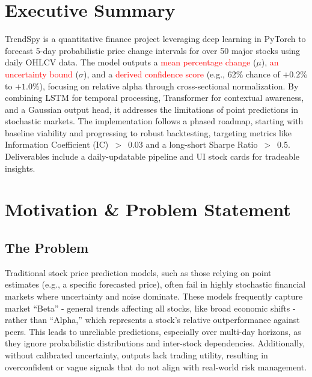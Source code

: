 \documentclass[twoside,final]{hcmut-report}
\begin{document}
\fancyfoot{}
\coverpage\clearpage

\tableofcontents\clearpage
\setcounter{page}{1}

\section*{Executive Summary}
TrendSpy is a quantitative finance project leveraging deep learning in PyTorch to forecast 5-day probabilistic price change intervals for over 50 major stocks using daily OHLCV data. The model outputs a \textcolor{red}{mean percentage change} ($\mu$), \textcolor{red}{an uncertainty bound} ($\sigma$), and a \textcolor{red}{derived confidence score} (e.g., 62\% chance of $+0.2\%$ to $+1.0\%$), focusing on relative alpha through cross-sectional normalization. By combining LSTM for temporal processing, Transformer for contextual awareness, and a Gaussian output head, it addresses the limitations of point predictions in stochastic markets. The implementation follows a phased roadmap, starting with baseline viability and progressing to robust backtesting, targeting metrics like Information Coefficient (IC)~$>$~0.03 and a long-short Sharpe Ratio~$>$~0.5. Deliverables include a daily-updatable pipeline and UI stock cards for tradeable insights.
\section{Motivation \& Problem Statement}
\subsection{The Problem}
Traditional stock price prediction models, such as those relying on point estimates (e.g., a specific forecasted price), often fail in highly stochastic financial markets where uncertainty and noise dominate. These models frequently capture market ``Beta'' - general trends affecting all stocks, like broad economic shifts - rather than ``Alpha,'' which represents a stock's relative outperformance against peers. This leads to unreliable predictions, especially over multi-day horizons, as they ignore probabilistic distributions and inter-stock dependencies. Additionally, without calibrated uncertainty, outputs lack trading utility, resulting in overconfident or vague signals that do not align with real-world risk management.
\end{document}
